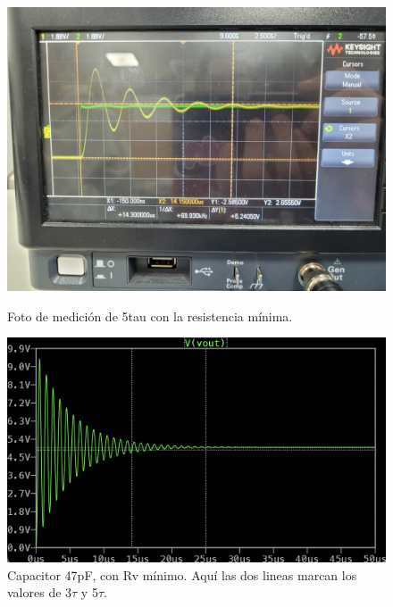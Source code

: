 \documentclass{article}
\begin{document}
        
                \begin{figure}[h]
    \centering
    \begin{minipage}{0.49\textwidth}
        \centering
        \includegraphics[width=\linewidth]{OSI5T.jpg}
        \caption{Foto de medición de 5tau con la resistencia mínima.}
        \label{fig:taureal}
    \end{minipage}\hfill
    \begin{minipage}{0.49\textwidth}
    \centering
 \includegraphics[width=\linewidth]{TAU47PF.png}
        \caption{Capacitor 47pF, con Rv mínimo. Aquí las dos lineas marcan los valores de 3$\tau$ y 5$\tau$. }
        \label{fig:tausim}

    \end{minipage}
\end{figure}
\end{document}
